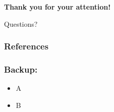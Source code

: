 \documentclass[
	10pt,
	t		%
]{beamer}
\begin{document}
\begin{frame}
    \begin{center}
        \vspace{1cm}
        {\large \textbf{Thank you for your attention!}}

        \vspace{2cm}

        \Huge{Questions?}
    \end{center}
\end{frame}

\begin{frame}
    \frametitle{References}
    \footnotesize
    
    
\end{frame}

\appendix

\begin{frame}
    \frametitle{Backup:}

    \begin{itemize}
        \item A
        \item B
    \end{itemize}
\end{frame}
\end{document}
